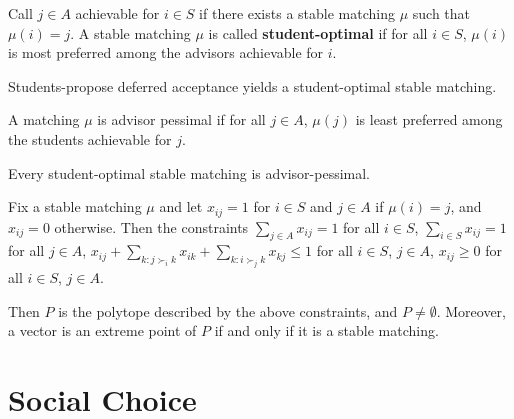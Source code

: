 \begin{thm}
  \label{sec:stable-matchings-3}
  Call $j \in A$ achievable for $i \in S$ if there exists a stable
  matching $\mu$ such that $\mu(i) = j$.  A stable matching $\mu$
  is called  \textbf{student-optimal} if for all $i \in S$, $\mu(i)$
  is most preferred among the advisors achievable for $i$.

  Students-propose deferred acceptance yields a student-optimal stable matching.
\end{thm}

\begin{thm}
  \label{sec:stable-matchings-4}
  A matching $\mu$ is advisor pessimal if for all $j \in A$, $\mu(j)$
  is least preferred among the students achievable for $j$.
  
  Every student-optimal stable matching is advisor-pessimal.
\end{thm}

\begin{thm}
  \label{sec:stable-matchings-5}
  Fix a stable matching $\mu$ and let $x_{ij} = 1$ for $i \in S$ and
  $j \in A$ if $\mu(i) = j$, and $x_{ij} = 0$ otherwise.  Then the
  constraints $\sum_{j \in A}^{} x_{ij} = 1$ for all $i \in S$,
  $\sum_{i \in S}^{} x_{ij} = 1$ for all $j \in A$, $x_{ij} + \sum_{k:
  j \succ_{i} k}^{} x_{ik} + \sum_{k: i \succ_{j} k}^{} x_{kj}
\leq 1$ for all $i \in S$, $j \in A$, $x_{ij} \geq 0$ for all $i \in
S$, $j \in A$.

Then $P$ is the polytope described by the above constraints, and $P
\neq \emptyset$.  Moreover, a vector is an extreme point of $P$ if and
only if it is a stable matching.
\end{thm}


\section{Social Choice}
\label{sec:social-choice}

